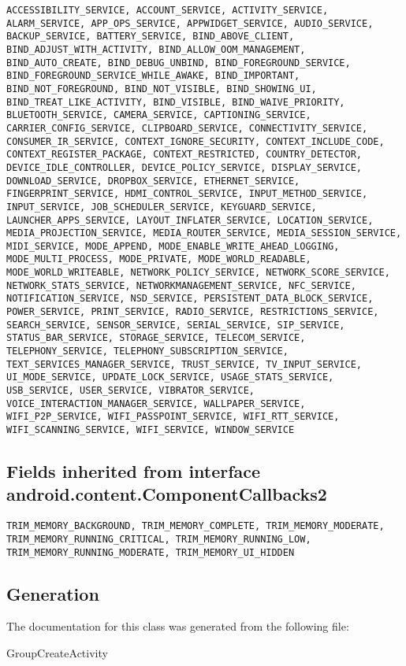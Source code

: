 \begin{lstlisting}
ACCESSIBILITY_SERVICE, ACCOUNT_SERVICE, ACTIVITY_SERVICE, ALARM_SERVICE, APP_OPS_SERVICE, APPWIDGET_SERVICE, AUDIO_SERVICE, BACKUP_SERVICE, BATTERY_SERVICE, BIND_ABOVE_CLIENT, BIND_ADJUST_WITH_ACTIVITY, BIND_ALLOW_OOM_MANAGEMENT, BIND_AUTO_CREATE, BIND_DEBUG_UNBIND, BIND_FOREGROUND_SERVICE, BIND_FOREGROUND_SERVICE_WHILE_AWAKE, BIND_IMPORTANT, BIND_NOT_FOREGROUND, BIND_NOT_VISIBLE, BIND_SHOWING_UI, BIND_TREAT_LIKE_ACTIVITY, BIND_VISIBLE, BIND_WAIVE_PRIORITY, BLUETOOTH_SERVICE, CAMERA_SERVICE, CAPTIONING_SERVICE, CARRIER_CONFIG_SERVICE, CLIPBOARD_SERVICE, CONNECTIVITY_SERVICE, CONSUMER_IR_SERVICE, CONTEXT_IGNORE_SECURITY, CONTEXT_INCLUDE_CODE, CONTEXT_REGISTER_PACKAGE, CONTEXT_RESTRICTED, COUNTRY_DETECTOR, DEVICE_IDLE_CONTROLLER, DEVICE_POLICY_SERVICE, DISPLAY_SERVICE, DOWNLOAD_SERVICE, DROPBOX_SERVICE, ETHERNET_SERVICE, FINGERPRINT_SERVICE, HDMI_CONTROL_SERVICE, INPUT_METHOD_SERVICE, INPUT_SERVICE, JOB_SCHEDULER_SERVICE, KEYGUARD_SERVICE, LAUNCHER_APPS_SERVICE, LAYOUT_INFLATER_SERVICE, LOCATION_SERVICE, MEDIA_PROJECTION_SERVICE, MEDIA_ROUTER_SERVICE, MEDIA_SESSION_SERVICE, MIDI_SERVICE, MODE_APPEND, MODE_ENABLE_WRITE_AHEAD_LOGGING, MODE_MULTI_PROCESS, MODE_PRIVATE, MODE_WORLD_READABLE, MODE_WORLD_WRITEABLE, NETWORK_POLICY_SERVICE, NETWORK_SCORE_SERVICE, NETWORK_STATS_SERVICE, NETWORKMANAGEMENT_SERVICE, NFC_SERVICE, NOTIFICATION_SERVICE, NSD_SERVICE, PERSISTENT_DATA_BLOCK_SERVICE, POWER_SERVICE, PRINT_SERVICE, RADIO_SERVICE, RESTRICTIONS_SERVICE, SEARCH_SERVICE, SENSOR_SERVICE, SERIAL_SERVICE, SIP_SERVICE, STATUS_BAR_SERVICE, STORAGE_SERVICE, TELECOM_SERVICE, TELEPHONY_SERVICE, TELEPHONY_SUBSCRIPTION_SERVICE, TEXT_SERVICES_MANAGER_SERVICE, TRUST_SERVICE, TV_INPUT_SERVICE, UI_MODE_SERVICE, UPDATE_LOCK_SERVICE, USAGE_STATS_SERVICE, USB_SERVICE, USER_SERVICE, VIBRATOR_SERVICE, VOICE_INTERACTION_MANAGER_SERVICE, WALLPAPER_SERVICE, WIFI_P2P_SERVICE, WIFI_PASSPOINT_SERVICE, WIFI_RTT_SERVICE, WIFI_SCANNING_SERVICE, WIFI_SERVICE, WINDOW_SERVICE
\end{lstlisting}

\subsection{Fields inherited from interface android.content.ComponentCallbacks2}


\begin{lstlisting}
TRIM_MEMORY_BACKGROUND, TRIM_MEMORY_COMPLETE, TRIM_MEMORY_MODERATE, TRIM_MEMORY_RUNNING_CRITICAL, TRIM_MEMORY_RUNNING_LOW, TRIM_MEMORY_RUNNING_MODERATE, TRIM_MEMORY_UI_HIDDEN
\end{lstlisting}

\subsection{Generation}
The documentation for this class was generated from the following file\-:
\begin{DoxyCompactItemize}
\item GroupCreateActivity
\end{DoxyCompactItemize} 









